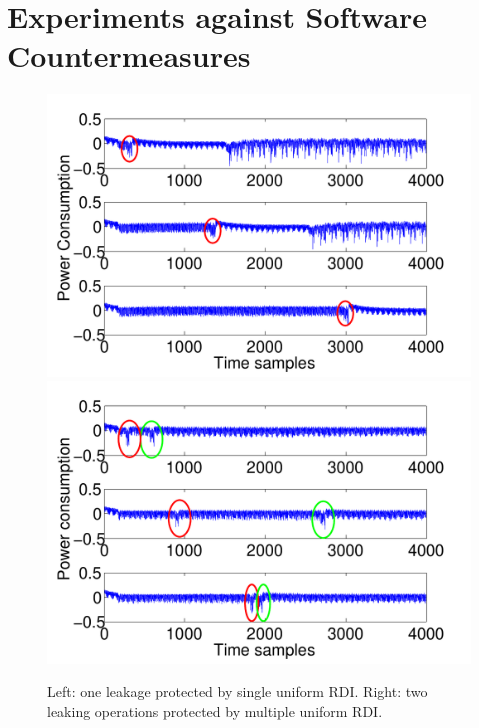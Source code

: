 \section{Experiments against Software Countermeasures}

\begin{figure}
\includegraphics[width=.5\textwidth]{../Figures/CHES2017/CW_shift_traces.pdf} 
\includegraphics[width=.5\textwidth]{../Figures/CHES2017/CW_double_shift_traces.pdf} 
\caption[Leakages hidden by Random Delay Interruption.]{Left: one leakage protected by single uniform RDI. Right: two leaking operations protected by multiple uniform RDI.}\label{fig:CW_shift_traces}
\end{figure}

